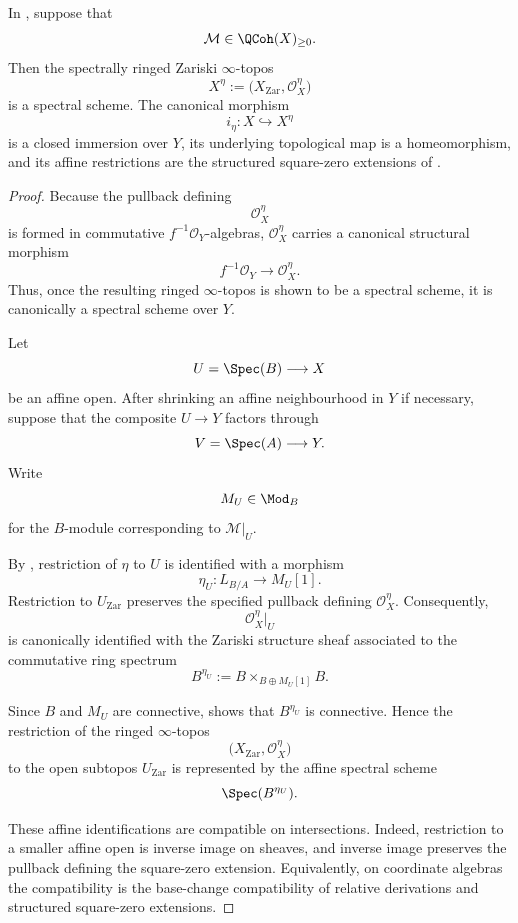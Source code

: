 \begin{theorem}
\label{thm:global-square-zero-spectral-scheme}
In , suppose that
\[
    \mathcal M
    \in
    \QCoh(X)_{\geq0}.
\]
Then the spectrally ringed Zariski $\infty$-topos
\[
    X^\eta
    :=
    \bigl(
        X_{\mathrm{Zar}},
        \mathcal O_X^\eta
    \bigr)
\]
is a spectral scheme. The canonical morphism
\[
    i_\eta
    \colon
    X
    \hookrightarrow
    X^\eta
\]
is a closed immersion over $Y$, its underlying topological map is a
homeomorphism, and its affine restrictions are the structured square-zero
extensions of .
\end{theorem}
\begin{proof}
Because the pullback defining
\[
    \mathcal O_X^\eta
\]
is formed in commutative \(f^{-1}\mathcal O_Y\)-algebras,
\(\mathcal O_X^\eta\) carries a canonical structural morphism
\[
    f^{-1}\mathcal O_Y
    \longrightarrow
    \mathcal O_X^\eta.
\]
Thus, once the resulting ringed \(\infty\)-topos is shown to be a
spectral scheme, it is canonically a spectral scheme over \(Y\).

Let
\[
    U=\Spec(B)
    \longrightarrow
    X
\]
be an affine open. After shrinking an affine neighbourhood in \(Y\) if
necessary, suppose that the composite \(U\to Y\) factors through
\[
    V=\Spec(A)
    \longrightarrow
    Y.
\]
Write
\[
    M_U
    \in
    \Mod_B
\]
for the \(B\)-module corresponding to
\(\mathcal M|_U\).

By
, restriction of
\(\eta\) to \(U\) is identified with a morphism
\[
    \eta_U
    \colon
    L_{B/A}
    \longrightarrow
    M_U[1].
\]
Restriction to \(U_{\mathrm{Zar}}\) preserves the specified pullback
defining \(\mathcal O_X^\eta\). Consequently,
\[
    \mathcal O_X^\eta|_U
\]
is canonically identified with the Zariski structure sheaf associated
to the commutative ring spectrum
\[
    B^{\eta_U}
    :=
    B
    \times_{B\oplus M_U[1]}
    B.
\]

Since \(B\) and \(M_U\) are connective,
 shows that
\(B^{\eta_U}\) is connective. Hence the restriction of the ringed
\(\infty\)-topos
\[
    \bigl(
        X_{\mathrm{Zar}},
        \mathcal O_X^\eta
    \bigr)
\]
to the open subtopos \(U_{\mathrm{Zar}}\) is represented by the affine
spectral scheme
\[
    \Spec(B^{\eta_U}).
\]

These affine identifications are compatible on intersections. Indeed,
restriction to a smaller affine open is inverse image on sheaves, and
inverse image preserves the pullback defining the square-zero
extension. Equivalently, on coordinate algebras the compatibility is
the base-change compatibility of relative derivations and structured
square-zero extensions.


\end{proof}
